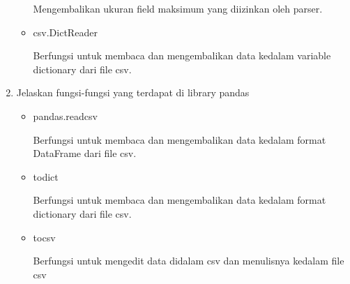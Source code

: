 \begin{enumerate}
\begin{itemize}
	Mengembalikan ukuran field maksimum yang diizinkan oleh parser.
	
	\item csv.DictReader
	
	Berfungsi untuk membaca dan mengembalikan data kedalam variable dictionary dari file csv.
	
	
\end{itemize}

\item Jelaskan fungsi-fungsi yang terdapat di library pandas
\begin{itemize}
	\item pandas.read\textunderscore csv
	
	Berfungsi untuk membaca dan mengembalikan data kedalam format DataFrame dari file csv.
	
	
	\item to\textunderscore dict
	
	Berfungsi untuk membaca dan mengembalikan data kedalam format dictionary dari file csv.
	
	
	\item to\textunderscore csv
	
	Berfungsi untuk mengedit data didalam csv dan menulisnya kedalam file csv
	
\end{itemize}
\end{enumerate}